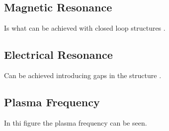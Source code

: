     \subsection{\textsf{Magnetic Resonance}}
        Is what can be achieved with closed loop structures \cite{abdulkarim_review_2022}.
    
    \subsection{\textsf{Electrical Resonance}}
        Can be achieved introducing gaps in the structure \cite{abdulkarim_review_2022}.

    \subsection{\textsf{Plasma Frequency}}
        In thi figure the plasma frequency can be seen.